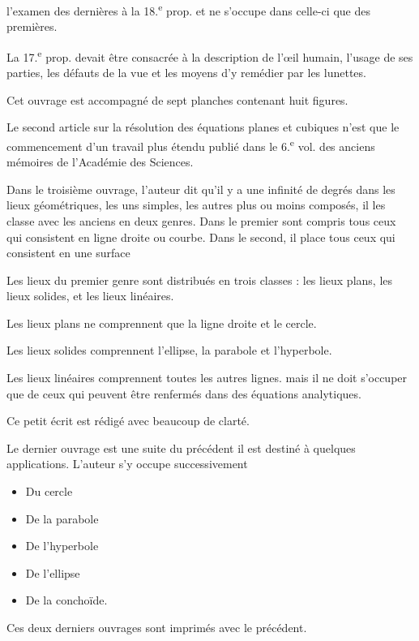 \documentclass[11pt,a4paper]{article}
\begin{document}
l'examen des dernières à la 18.\textsuperscript{e} prop. et ne s'occupe dans celle-ci que des premières.

La 17.\textsuperscript{e} prop. devait être consacrée à la description de l'œil humain, l'usage de ses parties, les défauts de la vue et les moyens d'y remédier par les lunettes.

Cet ouvrage est accompagné de sept planches contenant huit figures.

Le second article sur la résolution des équations planes et cubiques n'est que le commencement d'un travail plus étendu publié dans le 6.\textsuperscript{e} vol. des anciens mémoires de l'Académie des Sciences.

Dans le troisième ouvrage, l'auteur dit qu'il y a une infinité de degrés dans les lieux géométriques, les uns simples, les autres plus ou moins composés, il les classe avec les anciens en deux genres. Dans le premier sont compris tous ceux qui consistent en ligne droite ou courbe. Dans le second, il place tous ceux qui consistent en une surface

Les lieux du premier genre sont distribués en trois classes : les lieux plans, les lieux solides, et les lieux linéaires.

Les lieux plans ne comprennent que la ligne droite et le cercle.

Les lieux solides comprennent l'ellipse, la parabole et l'hyperbole.

Les lieux linéaires comprennent toutes les autres lignes. mais il ne doit s'occuper que de ceux qui peuvent être renfermés dans des équations analytiques.

Ce petit écrit est rédigé avec beaucoup de clarté.

Le dernier ouvrage est une suite du précédent il est destiné à quelques applications. L'auteur s'y occupe successivement
\begin{itemize}
  \item[332] Du cercle
  \item[336] De la parabole
  \item[338] De l'hyperbole
  \item[344] De l'ellipse
  \item[347.] De la conchoïde.
\end{itemize}
Ces deux derniers ouvrages sont imprimés avec le précédent.
\end{document}
